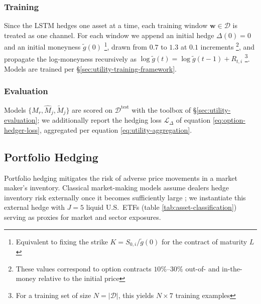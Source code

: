     \subsubsection{Training}
    Since the LSTM hedges one asset at a time, each training window
    \(\mathbf{w} \in \mathcal{D}\) is treated as one channel. For each
    window we append an initial hedge \(\Delta(0) = 0\) and an initial
    moneyness \(\tilde{g}(0)\) \footnote{Equivalent to fixing the strike
    \(K = S_{0,i}/\tilde{g}(0)\) for the contract of maturity \(L\)},
    drawn from \(0.7\) to \(1.3\) at \(0.1\) increments \footnote{These
    values correspond to option contracts \(10\%\)--\(30\%\) out-of- and
    in-the-money relative to the initial price}, and propagate the
    log-moneyness recursively as
    \(\log \tilde{g}(t) = \log \tilde{g}(t-1) + R_{t,i}\)
    \footnote{For a training set of size \(N = \vert\mathcal{D}\vert\),
    this yields \(N \times 7\) training examples}. Models are trained per
    §\ref{sec:utility-training-framework}.

    \subsubsection{Evaluation}
    Models \(\{M_r, \hat{M}_j, \tilde{M}_j\}\) are scored on
    \(\mathcal{D}^{\mathrm{test}}\) with the toolbox of
    §\ref{sec:utility-evaluation}; we additionally report the hedging loss
    \(\mathcal{L}_{\Delta}\) of equation \ref{eq:option-hedger-loss},
    aggregated per equation \ref{eq:utility-aggregation}.

\subsection{Portfolio Hedging}
    Portfolio hedging mitigates the risk of adverse price movements in a
    market maker's inventory. Classical market-making models assume dealers
    hedge inventory risk externally once it becomes sufficiently large
    \cite{Gueant2011}; we instantiate this external hedge with \(J = 5\)
    liquid U.S.\ ETFs (table \ref{tab:asset-classification}) serving as
    proxies for market and sector exposures.

